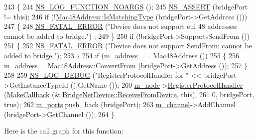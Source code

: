 \begin{DoxyCode}
243 \{
244   \hyperlink{log-macros-disabled_8h_a8f7e4afc291c9d29a65c18ac1f79197b}{NS\_LOG\_FUNCTION\_NOARGS} ();
245   \hyperlink{assert_8h_a6dccdb0de9b252f60088ce281c49d052}{NS\_ASSERT} (bridgePort != \textcolor{keyword}{this});
246   \textcolor{keywordflow}{if} (!\hyperlink{classns3_1_1Mac48Address_a55cc1e3c6aa63fd1a4f8f7d9be4ae182}{Mac48Address::IsMatchingType} (bridgePort->GetAddress ()))
247     \{
248       \hyperlink{group__fatal_ga5131d5e3f75d7d4cbfd706ac456fdc85}{NS\_FATAL\_ERROR} (\textcolor{stringliteral}{"Device does not support eui 48 addresses: cannot be added to bridge."})
      ;
249     \}
250   \textcolor{keywordflow}{if} (!bridgePort->SupportsSendFrom ())
251     \{
252       \hyperlink{group__fatal_ga5131d5e3f75d7d4cbfd706ac456fdc85}{NS\_FATAL\_ERROR} (\textcolor{stringliteral}{"Device does not support SendFrom: cannot be added to bridge."});
253     \}
254   \textcolor{keywordflow}{if} (\hyperlink{classns3_1_1BridgeNetDevice_a3a8897765d112fe99d399a4b4b947d2f}{m\_address} == Mac48Address ())
255     \{
256       \hyperlink{classns3_1_1BridgeNetDevice_a3a8897765d112fe99d399a4b4b947d2f}{m\_address} = \hyperlink{classns3_1_1Mac48Address_a911ce13603a9ef837545a032b6523ae4}{Mac48Address::ConvertFrom} (bridgePort->GetAddress ());
257     \}
258 
259   \hyperlink{group__logging_ga413f1886406d49f59a6a0a89b77b4d0a}{NS\_LOG\_DEBUG} (\textcolor{stringliteral}{"RegisterProtocolHandler for "} << bridgePort->GetInstanceTypeId ().GetName ());
260   \hyperlink{classns3_1_1BridgeNetDevice_a1880454d764d3c555c2fa71a9d66345e}{m\_node}->\hyperlink{classns3_1_1Node_af713f0e7ea5c49b4fa0b3613405c45fa}{RegisterProtocolHandler} (\hyperlink{group__makecallbackmemptr_ga9376283685aa99d204048d6a4b7610a4}{MakeCallback} (&
      \hyperlink{classns3_1_1BridgeNetDevice_a958c86321b73b2c400b54bfad9d03e68}{BridgeNetDevice::ReceiveFromDevice}, \textcolor{keyword}{this}),
261                                    0, bridgePort, \textcolor{keyword}{true});
262   \hyperlink{classns3_1_1BridgeNetDevice_accf2a9a81b4be28b155d6b5aeeb185be}{m\_ports}.push\_back (bridgePort);
263   \hyperlink{classns3_1_1BridgeNetDevice_a091384e0ef3d890c26a26d9681b22986}{m\_channel}->AddChannel (bridgePort->GetChannel ());
264 \}
\end{DoxyCode}


Here is the call graph for this function\+:


